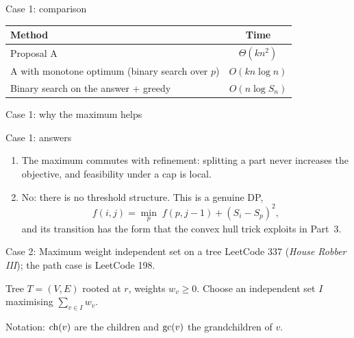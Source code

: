 \begin{frame}{Case 1: comparison}
	\begin{center}
		\begin{tabular}{@{}lc@{}}
			\toprule
			Method & Time\\
			\midrule
			Proposal A & $\Theta(kn^2)$\\
			A with monotone optimum (binary search over $p$) & $O(kn\log n)$\\
			Binary search on the answer + greedy & $O(n\log S_n)$\\
			\bottomrule
		\end{tabular}
	\end{center}
\end{frame}

\begin{frame}{Case 1: why the maximum helps}
\end{frame}

\begin{frame}{Case 1: answers}
	\begin{enumerate}
		\item The maximum commutes with refinement: splitting a part never increases the objective,
		and feasibility under a cap is local.
		\item No: there is no threshold structure. This is a genuine DP,
		\[
			f(i,j)=\min_p\; f(p,j-1)+(S_i-S_p)^2,
		\]
		and its transition has the form that the \alert{convex hull trick} exploits in Part~3.
	\end{enumerate}
\end{frame}

\begin{frame}{Case 2: Maximum weight independent set on a tree}
	LeetCode 337 (\emph{House Robber III}); the path case is LeetCode 198.

	\vspace{0.5em}
	Tree $T=(V,E)$ rooted at $r$, weights $w_v\ge0$. Choose an independent set $I$ maximising $\sum_{v\in I}w_v$.

	\vspace{0.5em}
	Notation: $\operatorname{ch}(v)$ are the children and $\operatorname{gc}(v)$ the grandchildren of $v$.
\end{frame}


